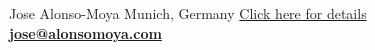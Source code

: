 \documentclass[lighthipster]{simplehipstercv}
\newlength{\rightcolwidth}
\begin{document}
\begin{paracol}{2}
\vfill{} %

\setlength{\parindent}{0pt}
\begin{minipage}[t]{\rightcolwidth}
\begin{center}\fontfamily{\sfdefault}\selectfont \color{black!70}
{\small Jose Alonso-Moya  Munich, Germany  \href{https://calendly.com/josealonso/informal}{Click here for details} \newline
{} \protect\textbf{\url{jose@alonsomoya.com}}
}
\end{center}
\end{minipage}

\end{paracol}
\end{document}
